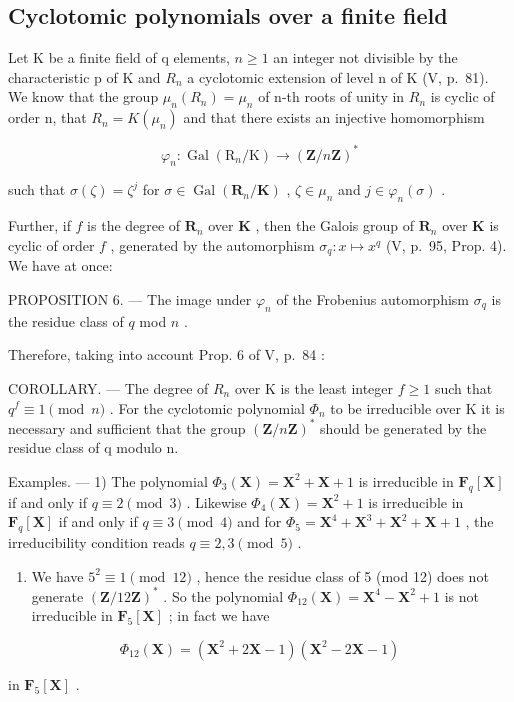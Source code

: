 \subsection{Cyclotomic polynomials over a finite field}

Let K be a finite field of q elements, \(n \geqslant 1\) an integer not divisible by the characteristic p of K and \(R_{n}\) a cyclotomic extension of level n of K (V, p.~81). We know that the group \(\mu_{n}(R_{n}) = \mu_{n}\) of n-th roots of unity in \(R_{n}\) is cyclic of order n, that \(R_{n} = K(\mu_{n})\) and that there exists an injective homomorphism

\[
\varphi_ {n}: \operatorname{Gal} \left(\mathrm{R} _ {n} / \mathrm{K}\right)\rightarrow (\mathbf {Z} / n \mathbf {Z}) ^ {*}
\]

such that \(\sigma(\zeta) = \zeta^j\) for \(\sigma \in \operatorname{Gal}(\mathbf{R}_n / \mathbf{K})\) , \(\zeta \in \mu_n\) and \(j \in \varphi_n(\sigma)\) .

Further, if \(f\) is the degree of \(\mathbf{R}_n\) over \(\mathbf{K}\) , then the Galois group of \(\mathbf{R}_n\) over \(\mathbf{K}\) is cyclic of order \(f\) , generated by the automorphism \(\sigma_q: x \mapsto x^q\) (V, p.~95, Prop. 4). We have at once:

PROPOSITION 6. --- The image under \(\varphi_{n}\) of the Frobenius automorphism \(\sigma_{q}\) is the residue class of \(q\) mod \(n\) .

Therefore, taking into account Prop. 6 of V, p.~84 :

COROLLARY. --- The degree of \(R_{n}\) over K is the least integer \(f \geqslant 1\) such that \(q^{f} \equiv 1 \pmod{n}\) . For the cyclotomic polynomial \(\Phi_{n}\) to be irreducible over K it is necessary and sufficient that the group \((\mathbf{Z}/n\mathbf{Z})^{*}\) should be generated by the residue class of q modulo n.

Examples. --- 1) The polynomial \(\Phi_3(\mathbf{X}) = \mathbf{X}^2 + \mathbf{X} + 1\) is irreducible in \(\mathbf{F}_q[\mathbf{X}]\) if and only if \(q \equiv 2 \pmod{3}\) . Likewise \(\Phi_4(\mathbf{X}) = \mathbf{X}^2 + 1\) is irreducible in \(\mathbf{F}_q[\mathbf{X}]\) if and only if \(q \equiv 3 \pmod{4}\) and for \(\Phi_5 = \mathbf{X}^4 + \mathbf{X}^3 + \mathbf{X}^2 + \mathbf{X} + 1\) , the irreducibility condition reads \(q \equiv 2, 3 \pmod{5}\) .

\begin{enumerate}
\def\labelenumi{\arabic{enumi})}
\setcounter{enumi}{1}
\tightlist
\item
  We have \(5^2 \equiv 1 \pmod{12}\) , hence the residue class of 5 (mod 12) does not generate \((\mathbf{Z}/12\mathbf{Z})^*\) . So the polynomial \(\Phi_{12}(\mathbf{X}) = \mathbf{X}^4 - \mathbf{X}^2 + 1\) is not irreducible in \(\mathbf{F}_5[\mathbf{X}]\) ; in fact we have
\end{enumerate}

\[
\Phi_ {12} (\mathbf {X}) = \left(\mathbf {X} ^ {2} + 2 \mathbf {X} - 1\right) \left(\mathbf {X} ^ {2} - 2 \mathbf {X} - 1\right)
\]

in \(\mathbf{F}_5[\mathbf{X}]\) .

